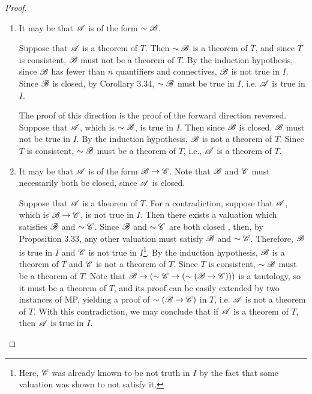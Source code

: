 \begin{proposition}
\begin{proof}
\begin{enumerate}
          \begin{enumerate}
            \item It may be that \(\mathscr{A}\) is of the form \(\sim\mathscr{B}\).

              \Ra{} Suppose that \(\mathscr{A}\) is a theorem of \(T\). Then \(\sim\mathscr{B}\) is a theorem of \(T\), and since \(T\) is consistent, \(\mathscr{B}\) must not be a theorem of \(T\). By the induction hypothesis, since \(\mathscr{B}\) has fewer than \(n\) quantifiers and connectives, \(\mathscr{B}\) is not true in \(I\). Since \(\mathscr{B}\) is closed, by Corollary 3.34, \(\sim\mathscr{B}\) must be true in \(I\), i.e. \(\mathscr{A}\) is true in \(I\).

              \La{} The proof of this direction is the proof of the forward direction reversed. Suppose that \(\mathscr{A}\), which is \(\sim\mathscr{B}\), is true in \(I\). Then since \(\mathscr{B}\) is closed, \(\mathscr{B}\) must not be true in \(I\). By the induction hypothesis, \(\mathscr{B}\) is not a theorem of \(T\). Since \(T\) is consistent, \(\sim\mathscr{B}\) must be a theorem of \(T\), i.e., \(\mathscr{A}\) is a theorem of \(T\).

            \item It may be that \(\mathscr{A}\) is of the form \(\mathscr{B} \rightarrow \mathscr{C}\). Note that \(\mathscr{B}\) and \(\mathscr{C}\) must necessarily both be closed, since \(\mathscr{A}\) is closed.

              \Ra{} Suppose that \(\mathscr{A}\) is a theorem of \(T\). For a contradiction, suppose that \(\mathscr{A}\), which is \(\mathscr{B} \rightarrow \mathscr{C}\), is not true in \(I\). Then there exists a valuation which satisfies \(\mathscr{B}\) and \(\sim\mathscr{C}\). Since \(\mathscr{B}\) and \(\sim\mathscr{C}\) are both closed \wfs{}, then, by Proposition 3.33, any other valuation must satisfy \(\mathscr{B}\) and \(\sim\mathscr{C}\). Therefore, \(\mathscr{B}\) is true in \(I\) and \(\mathscr{C}\) is not true in \(I\)\footnote{Here, \(\mathscr{C}\) was already known to be not truth in \(I\) by the fact that some valuation was shown to not satisfy it.}. By the induction hypothesis, \(\mathscr{B}\) is a theorem of \(T\) and \(\mathscr{C}\) is not a theorem of \(T\). Since \(T\) is consistent, \(\sim\mathscr{B}\) must be a theorem of \(T\). Note that \(\mathscr{B} \rightarrow (\sim\mathscr{C} \rightarrow (\sim(\mathscr{B} \rightarrow \mathscr{C})))\) is a tautology, so it must be a theorem of \(T\), and its proof can be easily extended by two instances of MP, yielding a proof of \(\sim(\mathscr{B} \rightarrow \mathscr{C})\) in \(T\), i.e. \(\mathscr{A}\) is not a theorem of \(T\). With this contradiction, we may conclude that if \(\mathscr{A}\) is a theorem of \(T\), then \(\mathscr{A}\) is true in \(I\).


\end{enumerate}
\end{enumerate}
\end{proof}
\end{proposition}

